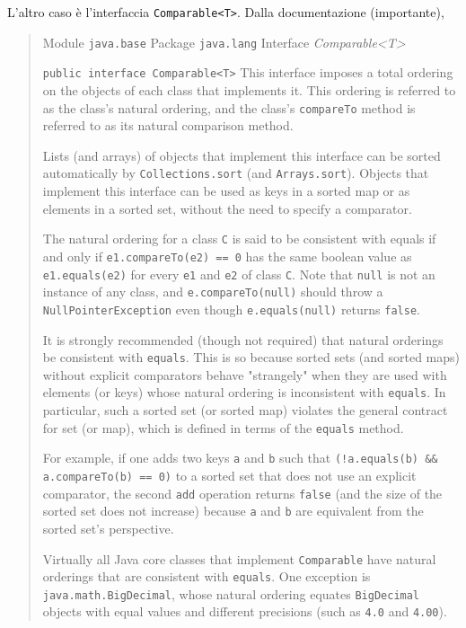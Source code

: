 \documentclass[\fontsizeclass,twocolumn]{\classname}
\theoremstyle{definition}
\theoremstyle{definition}
\begin{document}
L'altro caso è l'interfaccia \texttt{Comparable<T>}. Dalla documentazione
(importante),
\begin{quote}
    \footnotesize{Module \texttt{java.base}
    Package \texttt{java.lang}
    Interface \emph{Comparable<T>}

    \texttt{public interface Comparable<T>}
    This interface imposes a total ordering on the objects of each class that implements it. This ordering is referred to as the class's natural ordering, and the class's \texttt{compareTo} method is referred to as its natural comparison method.

    Lists (and arrays) of objects that implement this interface can be sorted automatically by \texttt{Collections.sort} (and \texttt{Arrays.sort}). Objects that implement this interface can be used as keys in a sorted map or as elements in a sorted set, without the need to specify a comparator.

    The natural ordering for a class \texttt{C} is said to be consistent with equals if and only if \texttt{e1.compareTo(e2) == 0} has the same boolean value as \texttt{e1.equals(e2)} for every \texttt{e1} and \texttt{e2} of class \texttt{C}. Note that \texttt{null} is not an instance of any class, and \texttt{e.compareTo(null)} should throw a \texttt{NullPointerException} even though \texttt{e.equals(null)} returns \texttt{false}.

    It is strongly recommended (though not required) that natural orderings be consistent with \texttt{equals}. This is so because sorted sets (and sorted maps) without explicit comparators behave "strangely" when they are used with elements (or keys) whose natural ordering is inconsistent with \texttt{equals}. In particular, such a sorted set (or sorted map) violates the general contract for set (or map), which is defined in terms of the \texttt{equals} method.

    For example, if one adds two keys \texttt{a} and \texttt{b} such that \texttt{(!a.equals(b) \&\& a.compareTo(b) == 0)} to a sorted set that does not use an explicit comparator, the second \texttt{add} operation returns \texttt{false} (and the size of the sorted set does not increase) because \texttt{a} and \texttt{b} are equivalent from the sorted set's perspective.

    Virtually all Java core classes that implement \texttt{Comparable} have natural orderings that are consistent with \texttt{equals}. One exception is \texttt{java.math.BigDecimal}, whose natural ordering equates \texttt{BigDecimal} objects with equal values and different precisions (such as \texttt{4.0} and \texttt{4.00}).

}
\end{quote}
\end{document}
